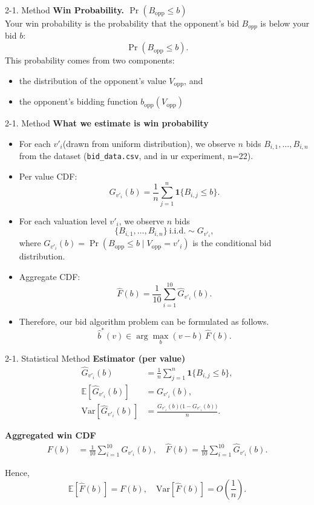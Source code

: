 \documentclass{beamer}
\begin{document}
\begin{frame}{2-1. Method}
\small
\textbf{Win Probability. $\Pr(B_{\text{opp}}\le b)$}\\
Your win probability is the probability that the opponent's bid $B_{opp}$
is below your bid $b$:
\[
\Pr(B_{\text{opp}}\le b).
\]
This probability comes from two components:
\begin{itemize}
    \item the distribution of the opponent’s value $V_{\text{opp}}$, and
    \item the opponent’s bidding function $b_{\text{opp}}(V_{\text{opp}})$
\end{itemize}
\end{frame}

\begin{frame}{2-1. Method}
\small
\textbf{What we estimate is win probability}
\begin{itemize}
  \item For each $v'_i$(drawn from uniform distribution), we observe $n$ bids $B_{i,1},\dots,B_{i,n}$ from the dataset (\texttt{bid\_data.csv}, and in ur experiment, n=22).
  \item Per value CDF:
  \[
  \hat G_{v'_i}(b)=\frac{1}{n}\sum_{j=1}^n \mathbf{1}\{B_{i,j}\le b\}.
  \]
  \item For each valuation level $v'_i$, we observe $n$ bids
  \[
    \{B_{i,1},\dots,B_{i,n}\}\ \text{i.i.d.}\sim G_{v'_i},
  \]
    where $G_{v'_i}(b)=\Pr(B_{\text{opp}}\le b\mid V_{\text{opp}}=v'_i)$
    is the conditional bid distribution.
  \item Aggregate CDF:
  \[
    \hat F(b)=\frac{1}{10}\sum_{i=1}^{10}\hat G_{v'_i}(b).
  \]
  \item Therefore, our bid algorithm problem can be formulated as follows.
  \[
    \hat b^*(v)\in\arg\max_{b}(v-b)\,\hat F(b).
  \]
\end{itemize}
\end{frame}

\begin{frame}{2-1. Statistical Method}
\small
\textbf{Estimator (per value)}
\begin{align*}
  \hat{G}_{v'_i}(b)
    &= \frac{1}{n}\sum_{j=1}^{n}\mathbf{1}\{B_{i,j}\le b\}, \\[4pt]
  \mathbb{E}[\hat{G}_{v'_i}(b)]
    &= G_{v'_i}(b), \\[4pt]
  \mathrm{Var}[\hat{G}_{v'_i}(b)]
    &= \frac{G_{v'_i}(b)\bigl(1-G_{v'_i}(b)\bigr)}{n}.
\end{align*}

\textbf{Aggregated win CDF}
\begin{align*}
  F(b) &= \frac{1}{10}\sum_{i=1}^{10} G_{v'_i}(b),\quad
  \hat{F}(b) = \frac{1}{10}\sum_{i=1}^{10} \hat{G}_{v'_i}(b).
\end{align*}

Hence,
\[
  \mathbb{E}[\hat{F}(b)] = F(b), 
  \quad
  \mathrm{Var}[\hat{F}(b)] = O\!\left(\frac{1}{n}\right).
\]
\end{frame}
\end{document}

